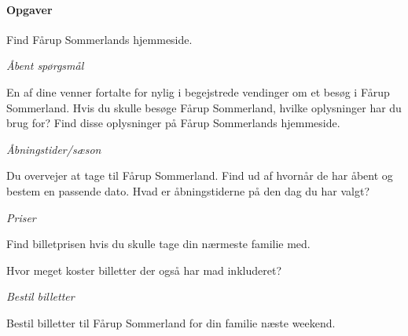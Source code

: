 \documentclass[10pt,a4paper]{article}      %
\begin{document}
\paragraph{Opgaver}
\begin{opgaver}
\item Find Fårup Sommerlands hjemmeside.

\item {\it Åbent spørgsmål}
    \begin{opgaver}
    \item En af dine venner fortalte for nylig i begejstrede vendinger om et
    besøg i Fårup Sommerland. Hvis du skulle besøge Fårup Sommerland, hvilke
    oplysninger har du brug for? Find disse oplysninger på Fårup Sommerlands
    hjemmeside.
    \end{opgaver}

    \begin{samepage}
    \item {\it Åbningstider/sæson}
        \begin{opgaver}
        \item Du overvejer at tage til Fårup Sommerland. Find ud af hvornår de har
            åbent og bestem en passende dato. Hvad er åbningstiderne på den dag du har
            valgt?
        \end{opgaver}
    \end{samepage}

\item {\it Priser}
    \begin{opgaver}
    \item Find billetprisen hvis du skulle tage din nærmeste familie med.
    \item Hvor meget koster billetter der også har mad inkluderet?  
    \end{opgaver}

\item {\it Bestil billetter}
    \begin{opgaver}
    \item Bestil billetter til Fårup Sommerland for din familie næste weekend.
    \end{opgaver}


\end{opgaver}
\end{document}
